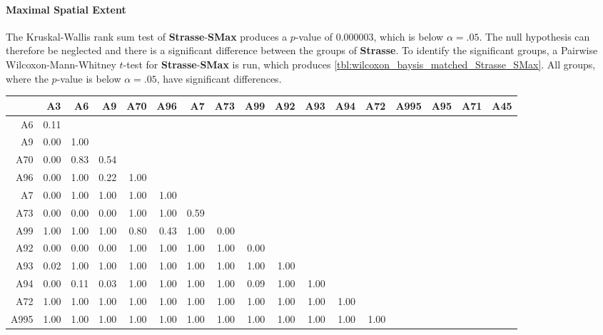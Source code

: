 \paragraph{Maximal Spatial Extent}
The Kruskal-Wallis rank sum test of \textbf{Strasse}-\textbf{SMax} produces a $p$-value of 0.000003, which is below $\alpha=.05$. The null hypothesis can therefore be neglected and there is a significant difference between the groups of \textbf{Strasse}. To identify the significant groups, a Pairwise Wilcoxon-Mann-Whitney $t$-test for \textbf{Strasse}-\textbf{SMax} is run, which produces \autoref{tbl:wilcoxon_baysis_matched_Strasse_SMax}. All groups, where the $p$-value is below $\alpha=.05$, have significant differences. 
\begin{table}[ht]
	\tiny
	\setlength{\tabcolsep}{4pt}
	\centering
	\begin{tabular}{rrrrrrrrrrrrrrrrr}
		\toprule
				& A3   & A6   & A9   & A70  & A96  & A7   & A73   & A99 & A92 & A93 & A94 & A72 & A995 & A95 & A71 & A45 \\ 
		\midrule
		A6 		& 0.11 &  &  &  &  &  &  &  &  &  &  &  &  &  &  &  \\ 
		A9 		& 0.00 & 1.00 &  &  &  &  &  &  &  &  &  &  &  &  &  &  \\ 
		A70 	& 0.00 & 0.83 & 0.54 &  &  &  &  &  &  &  &  &  &  &  &  &  \\ 
		A96 	& 0.00 & 1.00 & 0.22 & 1.00 &  &  &  &  &  &  &  &  &  &  &  &  \\ 
		A7 		& 0.00 & 1.00 & 1.00 & 1.00 & 1.00 &  &  &  &  &  &  &  &  &  &  &  \\ 
		A73 	& 0.00 & 0.00 & 0.00 & 1.00 & 1.00 & 0.59 &  &  &  &  &  &  &  &  &  &  \\ 
		A99 	& 1.00 & 1.00 & 1.00 & 0.80 & 0.43 & 1.00 & 0.00 &  &  &  &  &  &  &  &  &  \\ 
		A92 	& 0.00 & 0.00 & 0.00 & 1.00 & 1.00 & 1.00 & 1.00 & 0.00 &  &  &  &  &  &  &  &  \\ 
		A93 	& 0.02 & 1.00 & 1.00 & 1.00 & 1.00 & 1.00 & 1.00 & 1.00 & 1.00 &  &  &  &  &  &  &  \\ 
		A94 	& 0.00 & 0.11 & 0.03 & 1.00 & 1.00 & 1.00 & 1.00 & 0.09 & 1.00 & 1.00 &  &  &  &  &  &  \\ 
		A72 	& 1.00 & 1.00 & 1.00 & 1.00 & 1.00 & 1.00 & 1.00 & 1.00 & 1.00 & 1.00 & 1.00 &  &  &  &  &  \\ 
		A995 	& 1.00 & 1.00 & 1.00 & 1.00 & 1.00 & 1.00 & 1.00 & 1.00 & 1.00 & 1.00 & 1.00 & 1.00 &  &  &  &  \\ 

\end{tabular}
\end{table}

